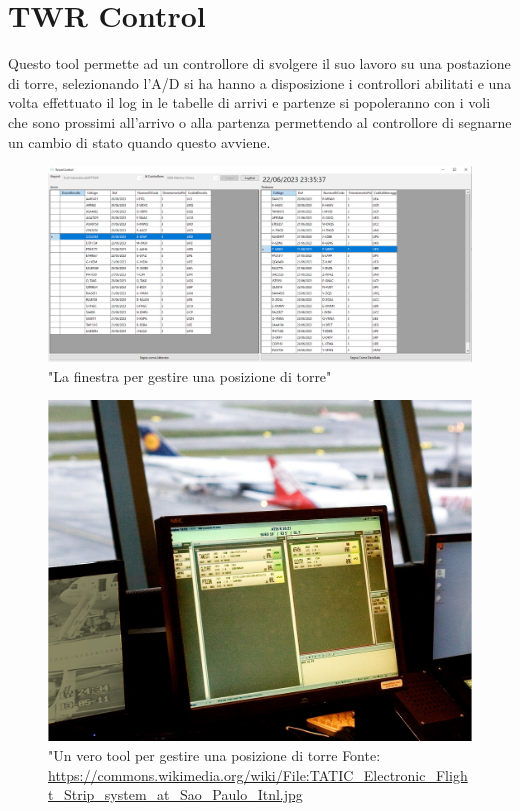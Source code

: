 \section{TWR Control}
Questo tool permette ad un controllore di svolgere il suo lavoro su una postazione di torre,
 selezionando l'A/D si ha hanno a disposizione i controllori abilitati e una volta effettuato il log in le tabelle di arrivi e partenze si popoleranno con i voli che sono prossimi all'arrivo o alla partenza permettendo al controllore di segnarne un cambio di stato quando questo avviene.
 \begin{figure}[H]
     \centering
     \includegraphics[width=1\textwidth]{figures/twr.PNG}
     \caption{"La finestra per gestire una posizione di torre"}
   \end{figure}
   \begin{figure}[H]
     \centering
     \includegraphics[width=12cm]{figures/TATIC_Electronic_Flight_Strip_system_at_Sao_Paulo_Itnl.jpg}
     \caption{"Un vero tool per gestire una posizione di torre Fonte: \url{https://commons.wikimedia.org/wiki/File:TATIC_Electronic_Flight_Strip_system_at_Sao_Paulo_Itnl.jpg}}
   \end{figure}

